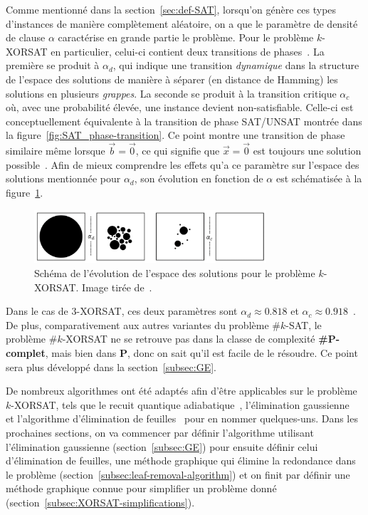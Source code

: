 Comme mentionné dans la section~\ref{sec:def-SAT}, lorsqu'on génère ces types d'instances de manière complètement aléatoire, on a que le paramètre de densité de clause $\alpha$ caractérise en grande partie le problème.
Pour le problème $k$-XORSAT en particulier, celui-ci contient deux transitions de phases~\cite{mezard_alternative_2002}.
La première se produit à $\alpha_d$, qui indique une transition \emph{dynamique} dans la structure de l'espace des solutions de manière à séparer (en distance de Hamming) les solutions en plusieurs \emph{grappes}.
La seconde se produit à la transition critique $\alpha_c$ où, avec une probabilité élevée, une instance devient non-satisfiable.
Celle-ci est conceptuellement équivalente à la transition de phase SAT/UNSAT montrée dans la figure~\ref{fig:SAT_phase-transition}.
Ce point montre une transition de phase similaire même lorsque $\vec{b} = \vec{0}$, ce qui signifie que $\vec{x} = \vec{0}$ est toujours une solution possible~\cite{ricci2001simplest}.
Afin de mieux comprendre les effets qu'a ce paramètre sur l'espace des solutions mentionnée pour $\alpha_d$, son évolution en fonction de $\alpha$ est schématisée à la figure~\ref{fig:solution-space}.
\begin{figure}[h]
    \centering
    \includegraphics[width=0.77\textwidth]{Figures/solution_space_evolution.jpeg}
    \caption[L'évolution de l'espace des solutions pour le problème \mbox{$k$-XORSAT}.]{Schéma de l'évolution de l'espace des solutions pour le problème \mbox{$k$-XORSAT}. Image tirée de~\protect\cite{moore_nature_2011}.}
    \label{fig:solution-space}
\end{figure}
Dans le cas de $3$-XORSAT, ces deux paramètres sont $\alpha_d \approx 0.818$ et $\alpha_c \approx 0.918$~\cite{mezard_alternative_2002}.
De plus, comparativement aux autres variantes du problème \#$k$-SAT, le problème \#$k$-XORSAT ne se retrouve pas dans la classe de complexité \textbf{\#P-complet}, mais bien dans \textbf{P}, donc on sait qu'il est facile de le résoudre.
Ce point sera plus développé dans la section~\ref{subsec:GE}.

De nombreux algorithmes ont été adaptés afin d'être applicables sur le problème $k$-XORSAT, tels que le recuit quantique adiabatique~\cite{patil_obstacles_2019}, l'élimination gaussienne~\cite{braunstein_complexity_2002} et l'algorithme d'élimination de feuilles~\cite{mezard_alternative_2002} pour en nommer quelques-uns.
Dans les prochaines sections, on va commencer par définir l'algorithme utilisant l'élimination gaussienne (section~\ref{subsec:GE}) pour ensuite définir celui d'élimination de feuilles, une méthode graphique qui élimine la redondance dans le problème (section~\ref{subsec:leaf-removal-algorithm}) et on finit par définir une méthode graphique connue pour simplifier un problème donné (section~\ref{subsec:XORSAT-simplifications}).

